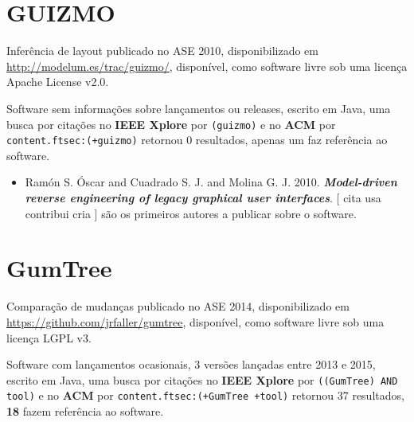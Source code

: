 \section{GUIZMO}

Inferência de layout
publicado no ASE 2010,
disponibilizado em \url{http://modelum.es/trac/guizmo/},
disponível,
como software livre
sob uma licença Apache License v2.0.

Software sem informações sobre lançamentos ou releases,
escrito em Java,
uma busca por citações no {\bf IEEE Xplore} por
\texttt{(guizmo)}
e no {\bf ACM} por
\texttt{content.ftsec:(+guizmo)}
retornou
0 resultados,
apenas um faz referência ao software.

\begin{itemize}
\item Ram{\'{o}}n S. {\'{O}}scar and Cuadrado S. J. and Molina G. J.
      2010.
        \textbf{\textit{ Model-driven reverse engineering of legacy graphical user interfaces}}.
      [
          cita
          usa
          contribui
          cria
      ]
são os primeiros autores a publicar sobre o software.
\end{itemize}
\section{GumTree}

Comparação de mudanças
publicado no ASE 2014,
disponibilizado em \url{https://github.com/jrfaller/gumtree},
disponível,
como software livre
sob uma licença LGPL v3.

Software com lançamentos ocasionais,
3 versões lançadas
entre 2013 e 2015,
escrito em Java,
uma busca por citações no {\bf IEEE Xplore} por
\texttt{((GumTree) AND tool)}
e no {\bf ACM} por
\texttt{content.ftsec:(+GumTree +tool)}
retornou
37 resultados,
{\bf 18} fazem referência ao software.


